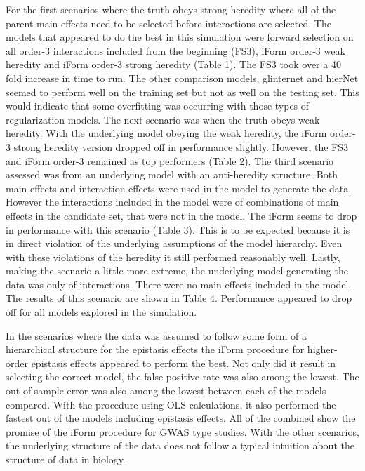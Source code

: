\documentclass[]{book}
\theoremstyle{definition}
\theoremstyle{definition}
\theoremstyle{remark}
\begin{document}
For the first scenarios where the truth obeys strong heredity where all
of the parent main effects need to be selected before interactions are
selected. The models that appeared to do the best in this simulation
were forward selection on all order-3 interactions included from the
beginning (FS3), iForm order-3 weak heredity and iForm order-3 strong
heredity (Table 1). The FS3 took over a 40 fold increase in time to run.
The other comparison models, glinternet and hierNet seemed to perform
well on the training set but not as well on the testing set. This would
indicate that some overfitting was occurring with those types of
regularization models. The next scenario was when the truth obeys weak
heredity. With the underlying model obeying the weak heredity, the iForm
order-3 strong heredity version dropped off in performance slightly.
However, the FS3 and iForm order-3 remained as top performers (Table 2).
The third scenario assessed was from an underlying model with an
anti-heredity structure. Both main effects and interaction effects were
used in the model to generate the data. However the interactions
included in the model were of combinations of main effects in the
candidate set, that were not in the model. The iForm seems to drop in
performance with this scenario (Table 3). This is to be expected because
it is in direct violation of the underlying assumptions of the model
hierarchy. Even with these violations of the heredity it still performed
reasonably well. Lastly, making the scenario a little more extreme, the
underlying model generating the data was only of interactions. There
were no main effects included in the model. The results of this scenario
are shown in Table 4. Performance appeared to drop off for all models
explored in the simulation.

In the scenarios where the data was assumed to follow some form of a
hierarchical structure for the epistasis effects the iForm procedure for
higher-order epistasis effects appeared to perform the best. Not only
did it result in selecting the correct model, the false positive rate
was also among the lowest. The out of sample error was also among the
lowest between each of the models compared. With the procedure using OLS
calculations, it also performed the fastest out of the models including
epistasis effects. All of the combined show the promise of the iForm
procedure for GWAS type studies. With the other scenarios, the
underlying structure of the data does not follow a typical intuition
about the structure of data in biology.
\end{document}

